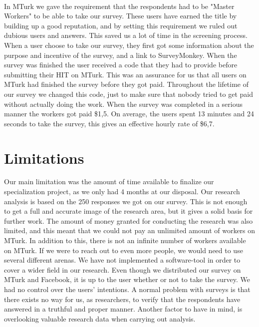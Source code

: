 \paragraph{}
In MTurk we gave the requirement that the respondents had to be "Master Workers" to be able to take our survey. These users have earned the title by building up a good reputation, and by setting this requirement we ruled out dubious users and answers. This saved us a lot of time in the screening process. When a user choose to take our survey, they first got some information about the purpose and incentive of the survey, and a link to SurveyMonkey. When the survey was finished the user received a code that they had to provide before submitting their HIT on MTurk. This was an assurance for us that all users on MTurk had finished the survey before they got paid. Throughout the lifetime of our survey we changed this code, just to make sure that nobody tried to get paid without actually doing the work. When the survey was completed in a serious manner the workers got paid \$1,5. On average, the users spent 13 minutes and 24 seconds to take the survey, this gives an effective hourly rate of \$6,7. 

\section{Limitations} 
Our main limitation was the amount of time available to finalize our specialization project, as we only had 4 months at our disposal. Our research analysis is based on the 250 responses we got on our survey. This is not enough to get a full and accurate image of the research area, but it gives a solid basis for further work. The amount of money granted for conducting the research was also limited, and this meant that we could not pay an unlimited amount of workers on MTurk. In addition to this, there is not an infinite number of workers available on MTurk. If we were to reach out to even more people, we would need to use several different arenas. We have not implemented a software-tool in order to cover a wider field in our research. Even though we distributed our survey on MTurk and Facebook, it is up to the user whether or not to take the survey. We had no control over the users' intentions. A normal problem with surveys is that there exists no way for us, as researchers, to verify that the respondents have answered in a truthful and proper manner. Another factor to have in mind, is overlooking valuable research data when carrying out analysis. 


